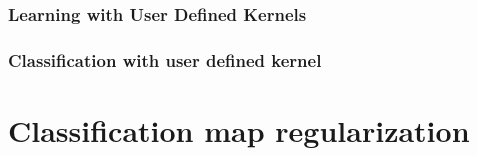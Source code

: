 \subsubsection{Learning with User Defined Kernels}
\label{sec:Learningwithuserdefinedkernel}
\ifitkFullVersion

\fi

\subsubsection{Classification with user defined kernel}

\ifitkFullVersion

\fi



\section{Classification map regularization}


\ifitkFullVersion

\fi



